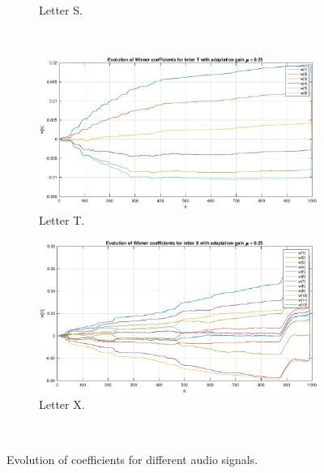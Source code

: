 \begin{figure}[H]
\begin{subfigure}{.32\textwidth}
  \caption{Letter S.}
\end{subfigure}\\
\begin{center}
\begin{subfigure}{.32\textwidth}
  \centering
  \includegraphics[width=\linewidth]{assignment4figs/wienerT.eps}
  \caption{Letter T.}
\end{subfigure}
\begin{subfigure}{.32\textwidth}
  \centering
  \includegraphics[width=\linewidth]{assignment4figs/wienerX.eps}  
  \caption{Letter X.}
\end{subfigure}
\end{center}\\
\caption{Evolution of coefficients for different audio signals.}
\label{fig:evolution}
\end{figure}



